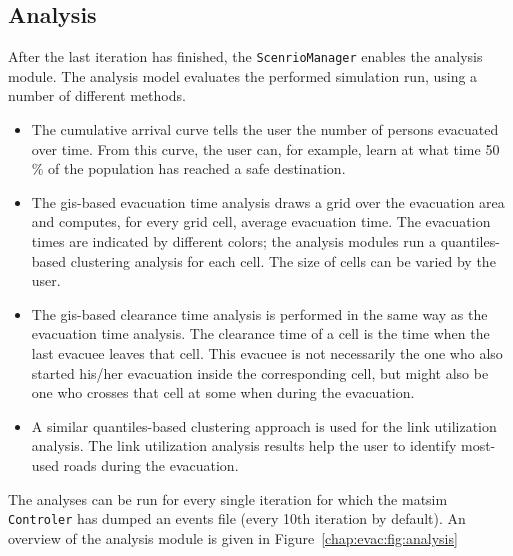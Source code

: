 \subsection{Analysis}
After the last iteration has finished, the \lstinline|ScenrioManager| enables the analysis module. The analysis model evaluates the performed simulation run, using a number of different methods. 
\begin{itemize}\styleItemize
\item The cumulative arrival curve tells the user the number of persons evacuated over time. From this curve, the user can, for example, learn at what time 50\,\% of the population has reached a safe destination.
\item The \gls{gis}-based evacuation time analysis draws a grid over the evacuation area and computes, for every grid cell, average evacuation time. The evacuation times are indicated by different colors; the analysis modules run a quantiles-based clustering analysis for each cell. The size of cells can be varied  by the user.
\item The \gls{gis}-based clearance time analysis is performed in the same way as the evacuation time  analysis. The clearance time of a cell is the time when the last evacuee leaves that cell. This evacuee is not necessarily the one who also started his/her evacuation inside the corresponding cell, but might also be one who crosses that cell at some when during the evacuation.
\item A similar quantiles-based clustering approach is used for the link utilization analysis. The link utilization analysis results help the user to identify most-used roads during the evacuation.
\end{itemize}
The analyses can be run for every single iteration for which the \gls{matsim} \lstinline|Controler| has dumped an events file (every 10th iteration by default). An overview of the analysis module is given in Figure~\ref{chap:evac:fig:analysis}

